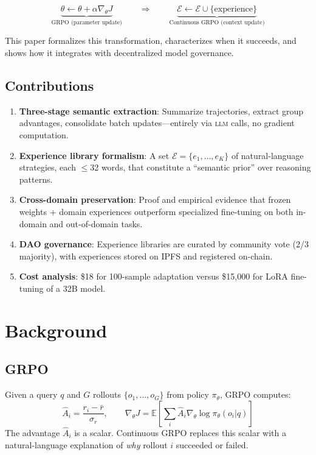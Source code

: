 \documentclass[11pt,letterpaper]{article}
\newcommand{\LLM}{\textsc{llm}}
\begin{document}
\begin{equation}
    \underbrace{\theta \leftarrow \theta + \alpha \nabla_\theta J}_{\text{GRPO (parameter update)}} \qquad \Longrightarrow \qquad \underbrace{\mathcal{E} \leftarrow \mathcal{E} \cup \{\text{experience}\}}_{\text{Continuous GRPO (context update)}}
\end{equation}

This paper formalizes this transformation, characterizes when it succeeds, and shows how it integrates with decentralized model governance.

\subsection{Contributions}

\begin{enumerate}
    \item \textbf{Three-stage semantic extraction}: Summarize trajectories, extract group advantages, consolidate batch updates---entirely via \LLM{} calls, no gradient computation.
    \item \textbf{Experience library formalism}: A set $\mathcal{E} = \{e_1, \ldots, e_K\}$ of natural-language strategies, each $\leq$32 words, that constitute a ``semantic prior'' over reasoning patterns.
    \item \textbf{Cross-domain preservation}: Proof and empirical evidence that frozen weights + domain experiences outperform specialized fine-tuning on both in-domain and out-of-domain tasks.
    \item \textbf{DAO governance}: Experience libraries are curated by community vote (2/3 majority), with experiences stored on IPFS and registered on-chain.
    \item \textbf{Cost analysis}: \$18 for 100-sample adaptation versus \$15{,}000 for LoRA fine-tuning of a 32B model.
\end{enumerate}

\section{Background}
\label{sec:background}

\subsection{GRPO}

Given a query $q$ and $G$ rollouts $\{o_1, \ldots, o_G\}$ from policy $\pi_\theta$, GRPO computes:
\begin{equation}
    \hat{A}_i = \frac{r_i - \bar{r}}{\sigma_r}, \qquad \nabla_\theta J = \mathbb{E}\!\left[\sum_i \hat{A}_i \nabla_\theta \log \pi_\theta(o_i | q)\right]
\end{equation}
The advantage $\hat{A}_i$ is a scalar.  Continuous GRPO replaces this scalar with a natural-language explanation of \textit{why} rollout $i$ succeeded or failed.
\end{document}
